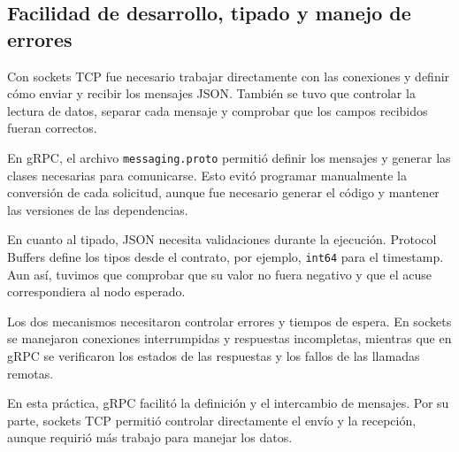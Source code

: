 
\subsection{Facilidad de desarrollo, tipado y manejo de errores}

Con sockets TCP fue necesario trabajar directamente con las conexiones y definir cómo enviar y recibir los mensajes JSON. También se tuvo que controlar la lectura de datos, separar cada mensaje y comprobar que los campos recibidos fueran correctos.

En gRPC, el archivo \texttt{messaging.proto} permitió definir los mensajes y generar las clases necesarias para comunicarse. Esto evitó programar manualmente la conversión de cada solicitud, aunque fue necesario generar el código y mantener las versiones de las dependencias.

En cuanto al tipado, JSON necesita validaciones durante la ejecución. Protocol Buffers define los tipos desde el contrato, por ejemplo, \texttt{int64} para el timestamp. Aun así, tuvimos que comprobar que su valor no fuera negativo y que el acuse correspondiera al nodo esperado.

Los dos mecanismos necesitaron controlar errores y tiempos de espera. En sockets se manejaron conexiones interrumpidas y respuestas incompletas, mientras que en gRPC se verificaron los estados de las respuestas y los fallos de las llamadas remotas.

En esta práctica, gRPC facilitó la definición y el intercambio de mensajes. Por su parte, sockets TCP permitió controlar directamente el envío y la recepción, aunque requirió más trabajo para manejar los datos.

